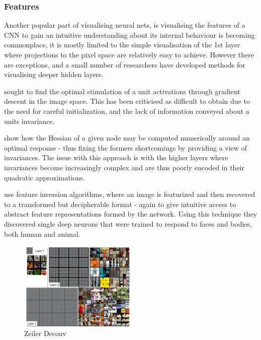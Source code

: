 \documentclass[a4paper,11pt,titlepage]{article}
\begin{document}
\subsubsection{Features}
		Another popular part of visualising neural nets, is visualising the features of a CNN to gain an intuitive understanding about its internal behaviour is becoming commonplace, it is mostly limited to the simple visualisation of the 1st layer where projections to the pixel space are relatively easy to achieve. However there are exceptions, and a small number of researchers have developed methods for visualising deeper hidden layers.
		\par 
		\textbf{\cite{Erhan2009}} sought to find the optimal stimulation of a unit activations through gradient descent in the image space. This has been criticised as difficult to obtain due to the need for careful initialization, and the lack of information conveyed about a units invariance. 
		\par 
		\textbf{\cite{Le2010}} show how the Hessian of a given node may be computed numerically around an optimal response - thus fixing the formers shortcomings by providing a view of invariances. The issue with this approach is with the higher layers where invariances become increasingly complex and are thus poorly encoded in their quadratic approximations. 
		\par 
		\textbf{\cite{Vondrick2013a}} use feature inversion algorithms, where an image is featurized and then recovered to a transformed but decipherable format - again to give intuitive access to abstract feature representations formed by the network. Using this technique they discovered single deep neurons that were trained to respond to faces and bodies, both human and animal. 
		\par
		
		\begin{figure}[H]
			\centering	
    			\includegraphics[width=0.5\textwidth]{img/zeiler_deconv.png} 
    			\caption{Zeiler Deconv}%
 		\end{figure}
 		
\end{document}
